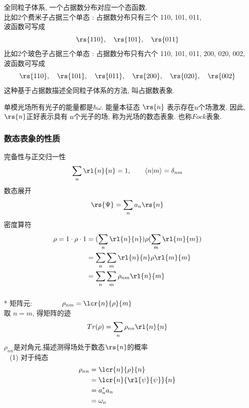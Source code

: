 \begin{frame} 
\frametitle{}
  全同粒子体系, 一个占据数分布对应一个态函数. \\ 
   比如2个费米子占据三个单态 : 占据数分布只有三个 {110}, {101}, {011}, \\  波函数可写成
   \[\rs{110}, \quad \rs{101}, \quad \rs{011}\]
   比如2个玻色子占据三个单态 : 占据数分布只有六个 {110}, {101}, {011}, {200}, {020}, {002},\\ 波函数可写成
   \[ \rs{110}, \quad \rs{101}, \quad \rs{011}, \quad \rs{200}, \quad \rs{020}, \quad \rs{002} \]
   这种基于占据数描述全同粒子体系的方法, 叫占据数表象. \\ {\vspace*{0.3em}}

  {\Bullet}单模光场所有光子的能量都是$\hbar \omega $. 能量本征态 $\rs{n}$ 表示存在n个场激发. 因此, $\rs{n}$正好表示具有 n个光子的场, 称为光场的数态表象. 也称$Fock$表象.
\end{frame}

\begin{frame} 
 \frametitle{数态表象的性质}
   完备性与正交归一性
   \[\sum_n \rl{n}{n} =1, \qquad \left\langle n|m\right\rangle = \delta _{nm} \]
   数态展开
   \[ \rs{\Psi} = \sum_n a_n \rs{n}\] 
   密度算符
  \[ \begin{aligned}
    \rho  = 1\cdot \rho \cdot 1  &= (\sum_n \rl{n}{n}) \rho (\sum_m \rl{m}{m}) \\ 
    &= \sum_n\sum_m \rl{n}{n}\rho\rl{m}{m} \\
    &= \sum_n\sum_m \rho_{nm}\rl{n}{m} 
  \end{aligned}\]
\end{frame}

\begin{frame}  
 \frametitle{}
 * 矩阵元: $ {\hspace*{4em}} \rho_{nm} = \lcr{n}{\rho}{m} $ \\ 
 取 $n=m$, 得矩阵的迹
 \[ Tr (\rho) = \sum_n \rho_{nn}\rl{n}{n} \]
 $\rho_{nn}$是对角元,描述测得场处于数态$\rs{n }$的概率\\ {\vspace*{0.6em}} 
 \证~ (1) 对于纯态  
 \[ \begin{aligned}
    \rho_{nn} & = \lcr{n}{\rho}{n} \\ 
    &= \lcr{n}{\rl{\psi}{\psi}}{n} \\ 
    &= a^*_n a_n \\ 
    &= \omega_n
  \end{aligned}\]   
\end{frame}

